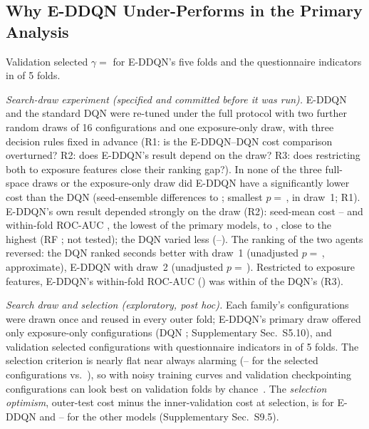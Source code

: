 \subsection{Why E-DDQN Under-Performs in the Primary Analysis}
\label{sec:why}
Validation selected $\gamma=$ \EDDQNGammas{} for E-DDQN's five folds and the questionnaire indicators in \EDDQNnProfile{} of 5 folds.

\emph{Search-draw experiment (specified and committed before it was run).} E-DDQN and the standard DQN were re-tuned under the full protocol with two further random draws of 16 configurations and one exposure-only draw, with three decision rules fixed in advance (R1: is the E-DDQN--DQN cost comparison overturned? R2: does E-DDQN's result depend on the draw? R3: does restricting both to exposure features close their ranking gap?). In none of the three full-space draws or the exposure-only draw did E-DDQN have a significantly lower cost than the DQN (seed-ensemble differences \SDCostDiffMin{} to \SDCostDiffMax; smallest $p=$\,\SDCostPMin, in draw~1; R1). E-DDQN's own result depended strongly on the draw (R2): seed-mean cost \SDEDDQNCostMin--\SDEDDQNCostMax{} and within-fold ROC-AUC \SDEDDQNWfMin, the lowest of the primary models, to \SDEDDQNWfMax, close to the highest (RF \PHWfRFAuc; not tested); the DQN varied less (\SDDQNWfMin--\SDDQNWfMax). The ranking of the two agents reversed: the DQN ranked seconds better with draw~1 (unadjusted $p=$\,\SDPairOneAucP, approximate), E-DDQN with draw~2 (unadjusted $p=$\,\SDPairTwoAucP). Restricted to exposure features, E-DDQN's within-fold ROC-AUC (\SDEDDQNExposureWfAuc) was within \SDExposureGap{} of the DQN's (R3).

\emph{Search draw and selection (exploratory, post hoc).} Each family's configurations were drawn once and reused in every outer fold; E-DDQN's primary draw offered only \PHDrawExposureEDDQN{} exposure-only configurations (DQN \PHDrawExposureDQN; Supplementary Sec.~S5.10), and validation selected configurations with questionnaire indicators in \EDDQNnProfile{} of 5 folds. The selection criterion is nearly flat near always alarming (\PHSelCostMin--\PHSelCostMax{} for the selected configurations vs.\ \AlwaysCost), so with noisy training curves and validation checkpointing configurations can look best on validation folds by chance~\cite{varma2006bias}. The \emph{selection optimism}, outer-test cost minus the inner-validation cost at selection, is \EDDQNOptGap{} for E-DDQN and \RFOptGap--\ECBOptGap{} for the other models (Supplementary Sec.~S9.5).

